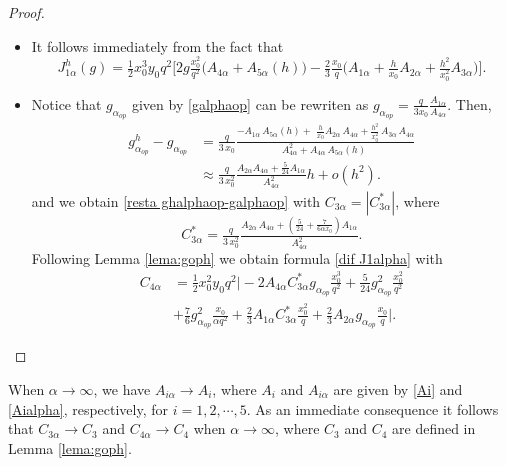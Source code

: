 \documentclass[axioms,article,submit,moreauthors]{Definitions/mdpi}
\begin{document}
    
    \begin{proof}
     $ $
     \begin{itemize}
     \item[(a)] It follows immediately from the fact that
     \[{J^h_{1\alpha}(g)}=\tfrac{1}{2}x_0^3 y_0
 q^2\Big[  2g \tfrac{x_0^2}{q^2}\Big( A_{4\alpha} + A_{5\alpha}(h)\Big) - \tfrac{2}{3} \tfrac{x_0}{
      q} \Big( A_{1\alpha} + \tfrac{h}{x_0} A_{2\alpha} + \tfrac{h^2}{x_0^2} A_{3\alpha}\Big)\Big].\]

\item[(b)] Notice that $g_{\alpha_{op}}$ given by \eqref{galphaop} can be rewriten as $g_{\alpha_{op}}=\tfrac{q}{3x_0} \tfrac{A_{1\alpha}}{A_{4\alpha}}.$
Then,
 \[ \begin{array}{ll}
        {g^h_{\alpha_{op}}}-g_{\alpha_{op}} & = \tfrac{q}{3\,x_0}  \tfrac {-A_{1\alpha}\,A_{5\alpha}(h)+\,\,\tfrac{h}{x_0} A_{2\alpha}\, A_{4\alpha} + \tfrac{h^2}{x_0^2}\,A_{3\alpha}\,A_{4\alpha}   }{A_{4\alpha}^2 + A_{4\alpha} \,A_{5\alpha}(h)\,\,}\\[0.45cm]
   & \approx\tfrac{q}{3\,x_0^2} \tfrac{  A_{2\alpha}A_{4\alpha}+\tfrac{5}{24}A_{1\alpha} }{ A_{4\alpha}^2} h+o(h^2).
   \end{array}\]
    and we obtain \eqref{resta ghalphaop-galphaop} with $C_{3\alpha}=|C_{3\alpha}^*|$, where \begin{equation}\label{C3alpha*}
    C_{3\alpha}^*=\tfrac{q}{3\,x_0^2} \tfrac{ A_{2\alpha} \,A_{4\alpha}+ \left(\tfrac{5}{24}+\tfrac{7}{6 \alpha x_0}\right)A_{1\alpha} }{A_{4\alpha}^2}. 
    \end{equation}
 Following  Lemma \ref{lema:goph} we obtain formula \eqref{dif J1alpha} with 
 \[\begin{array}{ll}
 C_{4\alpha} &= \tfrac{1}{2} x_0^2 y_0 q^2  \Big|-2A_{4\alpha} C_{3\alpha}^* g_{\alpha_{op}}\tfrac{x_0^3}{q^2} +\tfrac{5}{24} g_{\alpha_{op}}^2\tfrac{x_0^2}{ q^2}\\[0.45cm]
 &+\tfrac{7}{6} g_{\alpha_{op}}^2\tfrac{x_0}{ \alpha q^2}+\tfrac{2}{3}A_{1\alpha} C_{3\alpha}^* \tfrac{x_0^2}{q}+\tfrac{2}{3} A_{2\alpha} g_{\alpha_{op}} \tfrac{x_0}{q} \Big|.
 \end{array}
\]
     \end{itemize}
    \end{proof}
\begin{Remark} When $\alpha\to \infty$, we have 
     $A_{i\alpha}\to A_i$,  where $A_i$ and $A_{i\alpha}$ are given by \eqref{Ai} and \eqref{Aialpha}, respectively, for $i=1,2,\cdots, 5$.
   As an immediate consequence it follows that $C_{3\alpha}\to C_3$ and $C_{4\alpha}\to C_4$ when $\alpha\to\infty$, where $C_3$ and $C_4$ are defined in Lemma \ref{lema:goph}.
\end{Remark}
\end{document}
